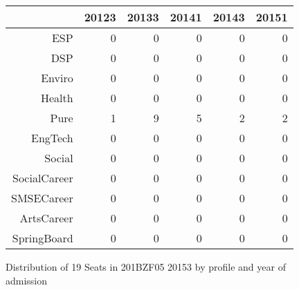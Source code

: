 \documentclass{article}\usepackage[]{graphicx}\usepackage[]{color}
\begin{document}
\begin{figure}[H]
\centering
\begin{tabular}{rrrrrr}
  \hline
 & 20123 & 20133 & 20141 & 20143 & 20151 \\ 
  \hline
ESP &   0 &   0 &   0 &   0 &   0 \\ 
  DSP &   0 &   0 &   0 &   0 &   0 \\ 
  Enviro &   0 &   0 &   0 &   0 &   0 \\ 
  Health &   0 &   0 &   0 &   0 &   0 \\ 
  Pure &   1 &   9 &   5 &   2 &   2 \\ 
  EngTech &   0 &   0 &   0 &   0 &   0 \\ 
  Social &   0 &   0 &   0 &   0 &   0 \\ 
  SocialCareer &   0 &   0 &   0 &   0 &   0 \\ 
  SMSECareer &   0 &   0 &   0 &   0 &   0 \\ 
  ArtsCareer &   0 &   0 &   0 &   0 &   0 \\ 
  SpringBoard &   0 &   0 &   0 &   0 &   0 \\ 
   \hline
\end{tabular}
\caption{Distribution of 19 Seats in 201BZF05 20153 by profile and year of admission} 
\end{figure}
\end{document}
